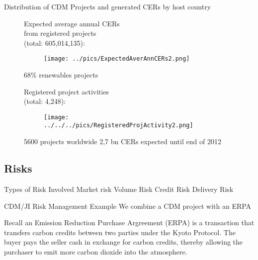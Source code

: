Distribution of CDM Projects and generated CERs by host country 
\begin{figure}[t]
	\begin{minipage}[t]{0.475\textwidth}
		Expected average annual CERs \\
		from registered projects \\
		(total: 605,014,135):
		\vspace*{-0.7cm}
		\begin{figure}
		\centering
		\texttt{[image: ../pics/ExpectedAverAnnCERs2.png]}
		\end{figure}
		\vspace*{-0.8cm}
		68\% renewables projects %
	\vspace*{-0.9cm}
	\end{minipage}
	
	\begin{minipage}[t]{0.475\textwidth}
		Registered project activities\\
		(total: 4,248):
		\vspace*{-0.7cm}
		\begin{figure}
		\centering
		\texttt{[image: ../../../pics/RegisteredProjActivity2.png]}
		\end{figure}
		\vspace*{-0.8cm}
		5600  projects worldwide
		2,7 bn CERs expected until end of 2012
	\end{minipage}
\end{figure}


\subsection{Risks}

Types of Risk Involved
	Market risk
	Volume Risk
	Credit Risk
	Delivery Risk


CDM/JI Risk Management Example
	We combine a CDM project with an ERPA
	
	Recall an Emission Reduction Purchase Argreement (ERPA) is a  transaction that transfers carbon credits between
	two parties under the Kyoto Protocol. The buyer pays the seller cash in exchange for carbon credits, thereby allowing the purchaser to emit more carbon dioxide into the atmosphere.
	
